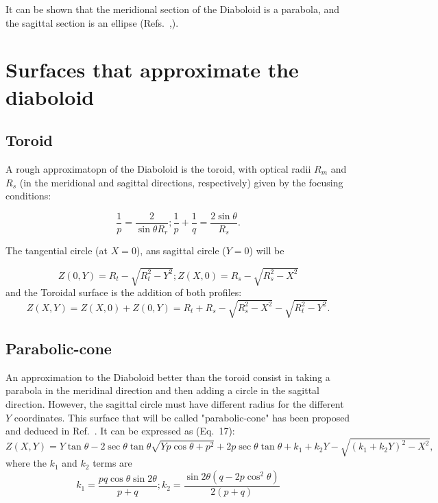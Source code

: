\documentclass[a4paper, 11pt]{article}
\begin{document}
It can be shown that the meridional section of the Diaboloid is a parabola, and the sagittal section is an ellipse (Refs.~\cite{Goldberg2020},\cite{Valeriy2020a}).

\section{Surfaces that approximate the diaboloid}

\subsection{Toroid}
A rough approximatopn of the Diaboloid is the toroid, with optical radii $R_m$ and $R_s$ (in the meridional and sagittal directions, respectively) given by the focusing conditions: 

\begin{equation}
\label{eqn:radii}
\frac{1}{p} = \frac{2 }{\sin\theta R_r};
\frac{1}{p} + \frac{1}{q} = \frac{2\sin\theta}{ R_s}.
\end{equation}

The tangential circle (at $X=0$), ans sagittal circle ($Y=0$) will be

\begin{equation}
\label{eqn:toroidTS}
Z(0,Y) = R_t - \sqrt{R_t^2 - Y^2}; 
Z(X,0) = R_s - \sqrt{R_s^2 - X^2}
\end{equation}
and the Toroidal surface is the addition of both profiles: 
\begin{equation}
\label{eqn:toroid}
Z(X,Y) = Z(X,0) + Z(0,Y) = 
R_t + R_s - \sqrt{R_s^2 - X^2}
- \sqrt{R_t^2 - Y^2}.
\end{equation}

\subsection{Parabolic-cone}
An approximation to the Diaboloid better than the toroid consist in taking a parabola in the meridinal direction and then adding a circle in the sagittal direction. However, the sagittal circle must have different radius for the different $Y$ coordinates. This surface that will be called "parabolic-cone" has been proposed and deduced in Ref.~\cite{Valeriy2020c}. It can be expressed as (Eq.~17):
\begin{equation}
\label{eqn:parabolicCone}
Z(X,Y) = Y \tan\theta - 2 \sec\theta \tan\theta
\sqrt{Y p \cos\theta + p^2} + 2 p \sec\theta \tan\theta +
k_1 + k_2 Y - \sqrt{(k_1 + k_2 Y)^2 - X^2},
\end{equation}
where the $k_1$ and $k_2$ terms are
\begin{equation}
k_1 = \frac{p q \cos\theta \sin2\theta}{p+q};
k_2 = \frac{\sin2\theta(q-2p\cos^2\theta)}{2(p+q)}
\end{equation}
\end{document}
